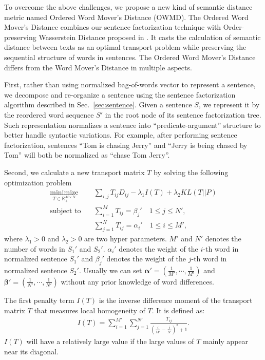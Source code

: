 To overcome the above challenges, we propose a new kind of semantic distance metric named Ordered Word Mover's Distance (OWMD). The Ordered Word Mover's Distance combines our sentence factorization technique with Order-preserving Wasserstein Distance proposed in \cite{su2017order}. It casts the calculation of semantic distance between texts as an optimal transport problem while preserving the sequential structure of words in sentences. The Ordered Word Mover's Distance differs from the Word Mover's Distance in multiple aspects.

First, rather than using normalized bag-of-words vector to represent a sentence, we decompose and re-organize a sentence using the sentence factorization algorithm described in Sec.~\ref{sec:sentence}. Given a sentence $S$, we represent it by the reordered word sequence $S'$ in the root node of its sentence factorization tree. Such representation normalizes a sentence into ``predicate-argument'' structure to better handle syntactic variations.
For example, after performing sentence factorization, sentences ``Tom is chasing Jerry'' and ``Jerry is being chased by Tom'' will both be normalized as ``chase Tom Jerry''.

Second, we calculate a new transport matrix $T$ by solving the following optimization problem
\begin{equation}
\label{eq:owmd}
\begin{split}
	\underset{T \in \mathbb{R}_{+}^{M\times N}}{\mbox{minimize}}\quad 		& \sum_{i,j} T_{ij} D_{ij} - \lambda_1 I(T) + \lambda_2 KL(T||P)\\
	\mbox{subject to}\quad & \sum\limits_{i = 1}^{M}  T_{ij} = \beta_j' \quad 1\leq j \leq N',\\
			   & \sum\limits_{j = 1}^{N}  T_{ij} = \alpha_i' \quad 1\leq i \leq M',
\end{split}
\end{equation}
where $\lambda_1 > 0$ and $\lambda_2 > 0$ are two hyper parameters.
$M'$ and $N'$ denotes the number of words in $S_1'$ and $S_2'$.
$\alpha_i'$ denotes the weight of the $i$-th word in normalized sentence $S_1'$ and $\beta_j'$ denotes the weight of the $j$-th word in normalized sentence $S_2'$. Usually we can set $\mathbf{\alpha'} = (\frac{1}{M'}, \cdots, \frac{1}{M'})$ and $\mathbf{\beta'} = (\frac{1}{N'}, \cdots, \frac{1}{N'})$ without any prior knowledge of word differences.

The first penalty term $I(T)$ is the inverse difference moment \cite{albregtsen2008statistical} of the transport matrix $T$ that measures local homogeneity of $T$. It is defined as:
\begin{equation}
\label{eq:IT}
\begin{split}
	I(T) = \sum\limits_{i=1}^{M'} \sum\limits_{j=1}^{N'} \frac{T_{ij}}{(\frac{i}{M'} - \frac{j}{N'})^2 + 1}.
\end{split}
\end{equation}
$I(T)$ will have a relatively large value if the large values of $T$ mainly appear near its diagonal.


